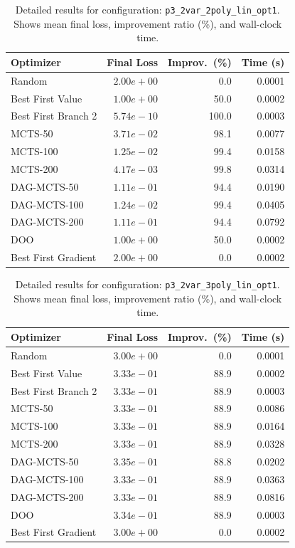 \begin{table}[H]
\centering
\caption{Detailed results for configuration: \texttt{p3\_2var\_2poly\_lin\_opt1}. Shows mean final loss, improvement ratio (\%), and wall-clock time.}
\label{tab:abssum-detail-16}
\begin{tabular}{lrrr}
\toprule
Optimizer & Final Loss & Improv.~(\%) & Time (s) \\
\midrule
Random & $2.00e+00$ & 0.0 & 0.0001 \\
\hline
Best First Value & $1.00e+00$ & 50.0 & 0.0002 \\
\hline
Best First Branch 2 & \textbf{$5.74e-10$} & 100.0 & 0.0003 \\
\hline
MCTS-50 & $3.71e-02$ & 98.1 & 0.0077 \\
\hline
MCTS-100 & $1.25e-02$ & 99.4 & 0.0158 \\
\hline
MCTS-200 & $4.17e-03$ & 99.8 & 0.0314 \\
\hline
DAG-MCTS-50 & $1.11e-01$ & 94.4 & 0.0190 \\
\hline
DAG-MCTS-100 & $1.24e-02$ & 99.4 & 0.0405 \\
\hline
DAG-MCTS-200 & $1.11e-01$ & 94.4 & 0.0792 \\
\hline
DOO & $1.00e+00$ & 50.0 & 0.0002 \\
\hline
Best First Gradient & $2.00e+00$ & 0.0 & 0.0002 \\
\bottomrule
\end{tabular}
\end{table}

\begin{table}[H]
\centering
\caption{Detailed results for configuration: \texttt{p3\_2var\_3poly\_lin\_opt1}. Shows mean final loss, improvement ratio (\%), and wall-clock time.}
\label{tab:abssum-detail-17}
\begin{tabular}{lrrr}
\toprule
Optimizer & Final Loss & Improv.~(\%) & Time (s) \\
\midrule
Random & $3.00e+00$ & 0.0 & 0.0001 \\
\hline
Best First Value & $3.33e-01$ & 88.9 & 0.0002 \\
\hline
Best First Branch 2 & \textbf{$3.33e-01$} & 88.9 & 0.0003 \\
\hline
MCTS-50 & $3.33e-01$ & 88.9 & 0.0086 \\
\hline
MCTS-100 & $3.33e-01$ & 88.9 & 0.0164 \\
\hline
MCTS-200 & $3.33e-01$ & 88.9 & 0.0328 \\
\hline
DAG-MCTS-50 & $3.35e-01$ & 88.8 & 0.0202 \\
\hline
DAG-MCTS-100 & $3.33e-01$ & 88.9 & 0.0363 \\
\hline
DAG-MCTS-200 & $3.33e-01$ & 88.9 & 0.0816 \\
\hline
DOO & $3.34e-01$ & 88.9 & 0.0003 \\
\hline
Best First Gradient & $3.00e+00$ & 0.0 & 0.0002 \\
\bottomrule
\end{tabular}
\end{table}

